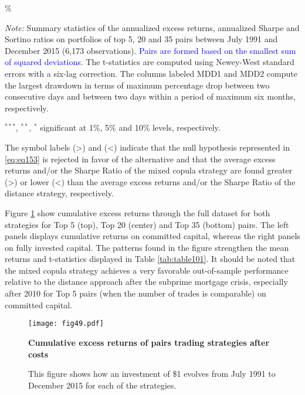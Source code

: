 \documentclass[a4paper]{article}
\begin{document}
\begin{threeparttable}[H]
\begin{tabularx}{\textwidth}{@{\extracolsep{\fill}}llllllll@{}}
		\bottomrule
	\end{tabularx}\%
	\begin{tablenotes}
		\item \textit{Note:} \scriptsize \tiny Summary statistics of the annualized excess returns, annualized Sharpe and Sortino ratios on portfolios of top 5, 20 and 35 pairs between July 1991 and December 2015 (6,173 observations). \textcolor{blue} {Pairs are formed based on the smallest sum of squared deviations}. The t-statistics are computed using Newey-West standard errors with a six-lag correction. The columns labeled MDD1 and MDD2 compute the largest drawdown in terms of maximum percentage drop between two consecutive days and between two days within a period of maximum six months, respectively.
		\item \scriptsize $^{\ast\ast\ast}$, $^{\ast\ast}$, $^{\ast}$  significant at 1\%, 5\% and 10\% levels, respectively.
		\item \tiny The symbol labels (>) and (<) indicate that the null hypothesis represented in \ref{eq:eq153} is rejected in favor of the alternative and that the average excess returns and/or the Sharpe Ratio of the mixed copula strategy are found greater (>) or lower (<) than the average excess returns and/or the Sharpe Ratio of the distance strategy, respectively.
	\end{tablenotes}
	\label{tab:table101}
\end{threeparttable}


\vspace{0.6cm}


Figure \ref{fig:fig49} show cumulative excess returns through the full dataset for both strategies for Top 5 (top), Top 20 (center) and Top 35 (bottom) pairs. The left panels displays cumulative returns on committed capital, whereas the right panels on fully invested capital. The patterns found in the figure strengthen the mean returns and t-statistics displayed in Table \ref{tab:table101}. It should be noted that the mixed copula strategy achieves a very favorable out-of-sample performance relative to the distance approach after the subprime mortgage crisis, especially after 2010 for Top 5 pairs (when the number of trades is comparable) on committed capital. 

\begin{figure}[H]
	\centering
	\texttt{[image: fig49.pdf]}
	\caption{\textbf{Cumulative excess returns of pairs trading strategies after costs}}
	\caption*{\scriptsize This figure shows how an investment of \$1 evolves from July 1991 to December 2015 for each of the strategies.}
	\label{fig:fig49}
\end{figure}
\end{document}
